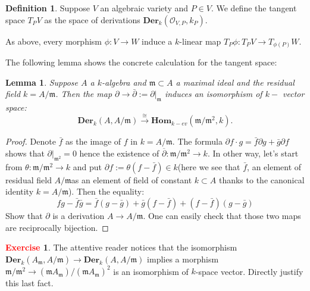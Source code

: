 \documentclass[12pt,a4paper,english]{article}
\theoremstyle{plain}
\newtheorem{lem}[thm]{Lemma}
\theoremstyle{definition}
\newtheorem{defi}{Definition}
\newtheorem{exercise}{\textbf{\textcolor{red}{Exercise}}}
\theoremstyle{remark}
\newcommand{\homo}{\mathbf{Hom}}
\newcommand{\der}{\textbf{Der}}
\begin{document}
\begin{defi}
Suppose $V$ an algebraic variety and $P\in V$. We define the tangent space $T_{P}V$ as the space of derivations $\der_{k}(\mathcal{O}_{V,P}, k_{P})$.
\end{defi}

As above, every morphism $\phi:V\rightarrow W$ induce a $k$-linear map $T_{P}\phi:T_{P}V\rightarrow T_{\phi(P)}W$.    

The following lemma shows the concrete calculation for the tangent space:
\begin{lem}\label{derisomorphism}
Suppose $A$ a $k$-algebra and $\mathfrak{m}\subset A$ a maximal ideal and the residual field $k=A/\mathfrak{m}$. Then the map $\partial\rightarrow \bar{\partial}:=\partial|_{\mathfrak{m}}$ induces an isomorphism of $k-$ vector space:
\begin{equation*}
    \der_{k}(A,A/\mathfrak{m})\xrightarrow{\cong} \homo_{k-ev}(\mathfrak{m}/\mathfrak{m}^{2},k).
\end{equation*}
\end{lem}
\begin{proof}
Denote $\bar{f}$ as the image of $f$ in $k=A/\mathfrak{m}$. The formula $\partial f\cdot g=\bar{f}\partial g+\bar{g}\partial f$ shows that $\partial|_{\mathfrak{m}^{2}}=0$ hence the existence of $\overline{\partial}:\mathfrak{m}/\mathfrak{m}^{2}\rightarrow k$. In other way, let's start from $\theta:\mathfrak{m}/\mathfrak{m}^{2}\rightarrow k$ and put $\partial f:=\theta(f-\bar{f})\in k$(here we see that $\bar{f}$, an element of residual field $A/\mathfrak{m}$as an element of field of constant $k\subset A$ thanks to the canonical identity $k=A/\mathfrak{m}$). Then the equality:
\begin{equation*}
   fg-\bar{f}\bar{g}=\bar{f}(g-\bar{g})+\bar{g}(f-\bar{f})+(f-\bar{f})(g-\bar{g}) 
\end{equation*}
Show that $\partial$ is a derivation $A\rightarrow A/\mathfrak{m}$. One can easily check that those two maps are reciprocally bijection. 
\end{proof}
\begin{exercise}
The attentive reader notices that the isomorphism $\der_{k}(A_{\mathfrak{m}},A/\mathfrak{m})\rightarrow  \der_{k}(A,A/\mathfrak{m})$ implies a morphism $\mathfrak{m}/\mathfrak{m}^{2}\rightarrow (\mathfrak{m}A_{\mathfrak{m}})/(\mathfrak{m}A_{\mathfrak{m}})^{2}$ is an isomorphism of $k$-space vector. Directly justify this last fact.  
\end{exercise}
\end{document}
